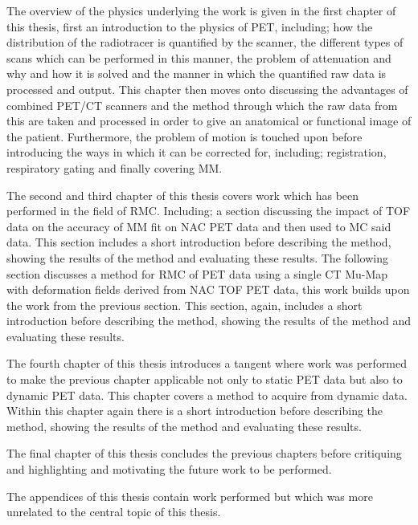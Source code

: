         The overview of the physics underlying the work is given in the first chapter of this thesis, first an introduction to the physics of \gls{PET}, including; how the distribution of the radiotracer is quantified by the scanner, the different types of scans which can be performed in this manner, the problem of attenuation and why and how it is solved and the manner in which the quantified raw data is processed and output. This chapter then moves onto discussing the advantages of combined \gls{PET}/\gls{CT} scanners and the method through which the raw data from this are taken and processed in order to give an anatomical or functional image of the patient. Furthermore, the problem of motion is touched upon before introducing the ways in which it can be corrected for, including; registration, respiratory gating and finally covering \gls{MM}.
        
        The second and third chapter of this thesis covers work which has been performed in the field of \gls{RMC}. Including; a section discussing the impact of \gls{TOF} data on the accuracy of \gls{MM} fit on \gls{NAC} \gls{PET} data and then used to \gls{MC} said data. This section includes a short introduction before describing the method, showing the results of the method and evaluating these results. The following section discusses a method for \gls{RMC} of \gls{PET} data using a single \gls{CT} \gls{Mu-Map} with deformation fields derived from \gls{NAC} \gls{TOF} \gls{PET} data, this work builds upon the work from the previous section. This section, again, includes a short introduction before describing the method, showing the results of the method and evaluating these results.
        
        The fourth chapter of this thesis introduces a tangent where work was performed to make the previous chapter applicable not only to static \gls{PET} data but also to dynamic \gls{PET} data. This chapter covers a method to acquire  from dynamic data.%
        Within this chapter again there is a short introduction before describing the method, showing the results of the method and evaluating these results.
        
        The final chapter of this thesis concludes the previous chapters before critiquing and highlighting and motivating the future work to be performed.

        The appendices of this thesis contain work performed but which was more unrelated to the central topic of this thesis.
